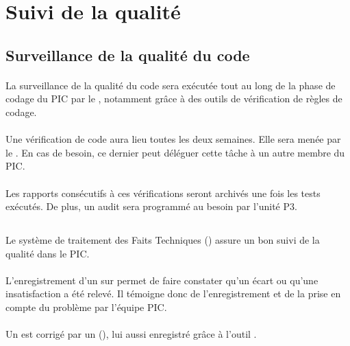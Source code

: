 \section{Suivi de la qualité}
\label{Suivi de la qualite}
\subsection{Surveillance de la qualité du code}
\label{Surveillance de la qualite du code}
\paragraph*{} La surveillance de la qualité du code sera exécutée tout au long de la phase de codage du
PIC par le \RD , notamment grâce à des outils de vérification de règles de codage.

\paragraph*{} Une vérification de code aura lieu toutes les deux semaines. Elle sera menée par le \RD . En cas de besoin, ce dernier peut déléguer cette tâche à un autre membre
du PIC.

\paragraph*{} Les rapports consécutifs à ces vérifications seront archivés une fois les tests exécutés. De plus, un audit sera programmé au besoin par l'unité P3.

\subsection{\FT}
\paragraph*{} Le système de traitement des Faits Techniques (\FTCourt) assure un bon suivi de la qualité dans
le PIC.

\paragraph*{} L'enregistrement d'un \FT{} sur \lintranet{} permet de faire constater qu'un écart ou
qu'une insatisfaction a été relevé. Il témoigne donc de l'enregistrement et de la prise en compte
du problème par l'équipe PIC.

\paragraph*{} Un \FTCourt{} est corrigé par un \OC{} (\OCCourt), lui aussi enregistré grâce à l'outil
\lintranet .

